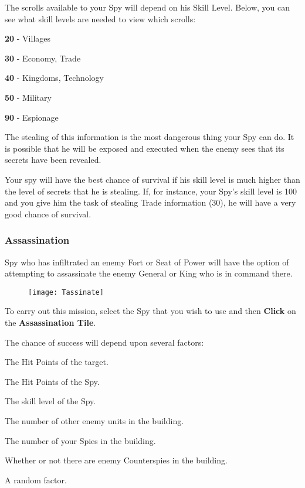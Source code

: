 The scrolls available to your Spy will depend on his Skill Level. Below, you can see what skill levels are needed to view which scrolls:

\begin{changemargin}{.5cm}{0cm}
\textbf{20} - Villages

\textbf{30} - Economy, Trade

\textbf{40} - Kingdoms, Technology

\textbf{50} - Military

\textbf{90} - Espionage \\ %
\end{changemargin}

The stealing of this information is the most dangerous thing your Spy can do. It is possible that he will be exposed and executed when the enemy sees that its secrets have been revealed.

Your spy will have the best chance of survival if his skill level is much higher than the level of secrets that he is stealing. If, for instance, your Spy’s skill level is 100 and you give him the task of stealing Trade information (30), he will have a very good chance of survival.

\subsubsection{\textsf{Assassination}}


 Spy who has infiltrated an enemy Fort or Seat of Power will have the option of attempting to assassinate the enemy General or King who is in command there.

\begin{wrapfigure}{r}{0.1\textwidth}
    \vspace{-20pt}
    \begin{center}
        \texttt{[image: Tassinate]}
    \end{center}
    \vspace{-20pt}
\end{wrapfigure}

To carry out this mission, select the Spy that you wish to use and then \textbf{Click} on the \textbf{Assassination Tile}.

\begin{changemargin}{.5cm}{0cm}
The chance of success will depend upon several factors:

The Hit Points of the target.

The Hit Points of the Spy.

The skill level of the Spy.

The number of other enemy units in the building.

The number of your Spies in the building.

Whether or not there are enemy Counterspies in the building.

A random factor.
\end{changemargin}

